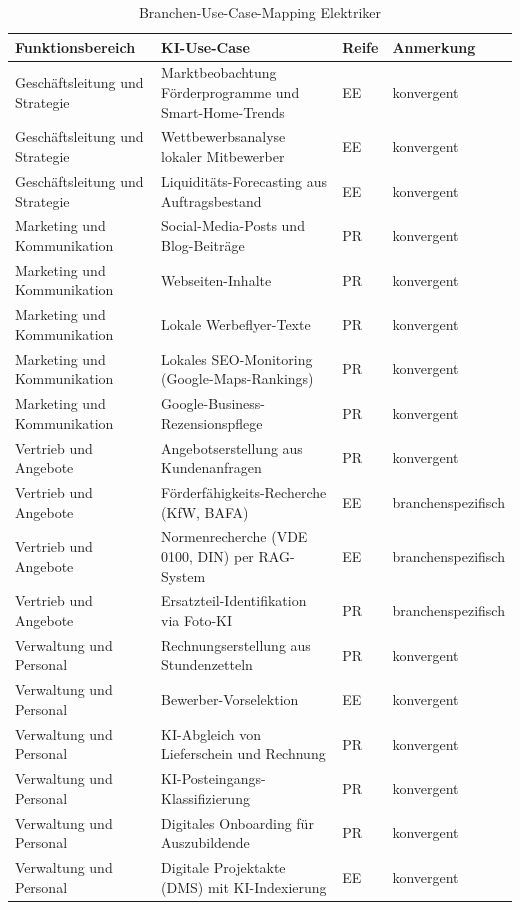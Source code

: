 \documentclass[a4paper,11pt]{article}
\begin{document}
\begin{table}[H]
\centering
\caption{Branchen-Use-Case-Mapping Elektriker}
\label{tab:mapping-elektriker}
\small
\begin{tabular}{p{3.3cm}p{7.3cm}p{1cm}p{2.5cm}}
\toprule
\textbf{Funktionsbereich} & \textbf{KI-Use-Case} & \textbf{Reife} & \textbf{Anmerkung} \\
\midrule
Geschäftsleitung und Strategie & Marktbeobachtung Förderprogramme und Smart-Home-Trends & EE & konvergent \\
Geschäftsleitung und Strategie & Wettbewerbsanalyse lokaler Mitbewerber & EE & konvergent \\
Geschäftsleitung und Strategie & Liquiditäts-Forecasting aus Auftragsbestand & EE & konvergent \\
Marketing und Kommunikation & Social-Media-Posts und Blog-Beiträge & PR & konvergent \\
Marketing und Kommunikation & Webseiten-Inhalte & PR & konvergent \\
Marketing und Kommunikation & Lokale Werbeflyer-Texte & PR & konvergent \\
Marketing und Kommunikation & Lokales SEO-Monitoring (Google-Maps-Rankings) & PR & konvergent \\
Marketing und Kommunikation & Google-Business-Rezensionspflege & PR & konvergent \\
Vertrieb und Angebote & Angebotserstellung aus Kundenanfragen & PR & konvergent \\
Vertrieb und Angebote & Förderfähigkeits-Recherche (KfW, BAFA) & EE & branchenspezifisch \\
Vertrieb und Angebote & Normenrecherche (VDE 0100, DIN) per RAG-System & EE & branchenspezifisch \\
Vertrieb und Angebote & Ersatzteil-Identifikation via Foto-KI & PR & branchenspezifisch \\
Verwaltung und Personal & Rechnungserstellung aus Stundenzetteln & PR & konvergent \\
Verwaltung und Personal & Bewerber-Vorselektion & EE & konvergent \\
Verwaltung und Personal & KI-Abgleich von Lieferschein und Rechnung & PR & konvergent \\
Verwaltung und Personal & KI-Posteingangs-Klassifizierung & PR & konvergent \\
Verwaltung und Personal & Digitales Onboarding für Auszubildende & PR & konvergent \\
Verwaltung und Personal & Digitale Projektakte (DMS) mit KI-Indexierung & EE & konvergent \\

\end{tabular}
\end{table}
\end{document}
